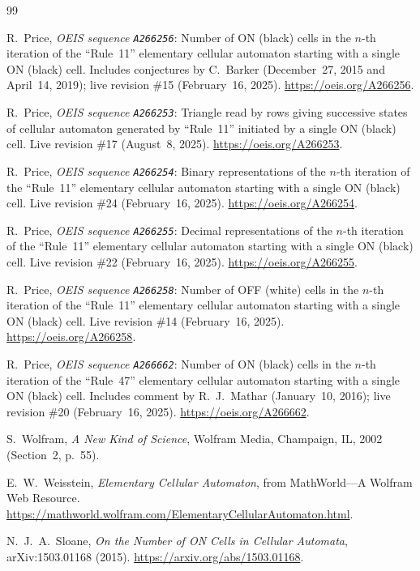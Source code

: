 \documentclass[11pt]{article}
\theoremstyle{definition}
\newcommand{\seq}[1]{\texttt{#1}}
\begin{document}
{\small
\begin{thebibliography}{99}\setlength{\itemsep}{2pt}
\raggedright

R.\ Price, \emph{OEIS sequence \seq{A266256}}: Number of ON (black) cells in the $n$-th iteration of the ``Rule~11'' elementary cellular automaton starting with a single ON (black) cell. Includes conjectures by C.\ Barker (December~27, 2015 and April~14, 2019); live revision \#15 (February~16, 2025). \url{https://oeis.org/A266256}.

R.\ Price, \emph{OEIS sequence \seq{A266253}}: Triangle read by rows giving successive states of cellular automaton generated by ``Rule~11'' initiated by a single ON (black) cell. Live revision \#17 (August~8, 2025). \url{https://oeis.org/A266253}.

R.\ Price, \emph{OEIS sequence \seq{A266254}}: Binary representations of the $n$-th iteration of the ``Rule~11'' elementary cellular automaton starting with a single ON (black) cell. Live revision \#24 (February~16, 2025). \url{https://oeis.org/A266254}.

R.\ Price, \emph{OEIS sequence \seq{A266255}}: Decimal representations of the $n$-th iteration of the ``Rule~11'' elementary cellular automaton starting with a single ON (black) cell. Live revision \#22 (February~16, 2025). \url{https://oeis.org/A266255}.

R.\ Price, \emph{OEIS sequence \seq{A266258}}: Number of OFF (white) cells in the $n$-th iteration of the ``Rule~11'' elementary cellular automaton starting with a single ON (black) cell. Live revision \#14 (February~16, 2025). \url{https://oeis.org/A266258}.

R.\ Price, \emph{OEIS sequence \seq{A266662}}: Number of ON (black) cells in the $n$-th iteration of the ``Rule~47'' elementary cellular automaton starting with a single ON (black) cell. Includes comment by R.~J.\ Mathar (January~10, 2016); live revision \#20 (February~16, 2025). \url{https://oeis.org/A266662}.

S.\ Wolfram, \emph{A New Kind of Science}, Wolfram Media, Champaign, IL, 2002 (Section~2, p.~55).

E.~W.\ Weisstein, \emph{Elementary Cellular Automaton}, from MathWorld---A Wolfram Web Resource. \url{https://mathworld.wolfram.com/ElementaryCellularAutomaton.html}.

N.~J.~A.\ Sloane, \emph{On the Number of ON Cells in Cellular Automata}, arXiv:1503.01168 (2015). \url{https://arxiv.org/abs/1503.01168}.

\end{thebibliography}
}
\end{document}
